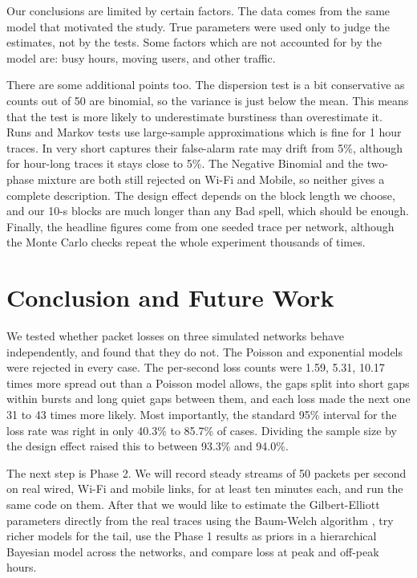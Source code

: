 \documentclass[conference]{IEEEtran}
\begin{document}
Our conclusions are limited by certain factors. The data comes from the same model that motivated the study. True parameters were used only to judge the estimates, not by the tests. Some factors which are not accounted for by the model are: busy hours, moving users, and other traffic.

There are some additional points too. The dispersion test is a bit conservative as counts out of 50 are binomial, so the variance is just below the mean. This means that the test is more likely to underestimate burstiness than overestimate it. Runs and Markov tests use large-sample approximations which is fine for 1 hour traces. In very short captures their false-alarm rate may drift from 5\%, although for hour-long traces it stays close to 5\%. The Negative Binomial and the two-phase mixture are both still rejected on Wi-Fi and Mobile, so neither gives a complete description. The design effect depends on the block length we choose, and our 10-s blocks are much longer than any Bad spell, which should be enough. Finally, the headline figures come from one seeded trace per network, although the Monte Carlo checks repeat the whole experiment thousands of times.

\section{Conclusion and Future Work}
We tested whether packet losses on three simulated networks behave independently, and found that they do not. The Poisson and exponential models were rejected in every case. The per-second loss counts were 1.59, 5.31, 10.17 times more spread out than a Poisson model allows, the gaps split into short gaps within bursts and long quiet gaps between them, and each loss made the next one 31 to 43 times more likely. Most importantly, the standard 95\% interval for the loss rate was right in only 40.3\% to 85.7\% of cases. Dividing the sample size by the design effect raised this to between 93.3\% and 94.0\%.

The next step is Phase 2. We will record steady streams of 50 packets per second on real wired, Wi-Fi and mobile links, for at least ten minutes each, and run the same code on them. After that we would like to estimate the Gilbert-Elliott parameters directly from the real traces using the Baum-Welch algorithm \cite{baum1970}, try richer models for the tail, use the Phase 1 results as priors in a hierarchical Bayesian model across the networks, and compare loss at peak and off-peak hours.
\end{document}
